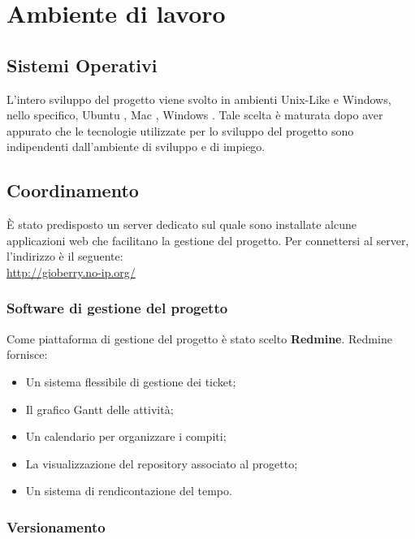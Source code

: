 
\section{Ambiente di lavoro} 

\subsection{Sistemi Operativi}

L’intero sviluppo del progetto viene svolto in ambienti Unix-Like e Windows, nello specifico, Ubuntu , Mac , Windows . Tale scelta è maturata dopo aver appurato che le tecnologie utilizzate per lo sviluppo del progetto sono indipendenti dall’ambiente di sviluppo e di impiego.

\subsection{Coordinamento}

È stato predisposto un server dedicato sul quale sono installate alcune applicazioni web
che facilitano la gestione del progetto. Per connettersi al server, l'indirizzo è il seguente:\\
\url{http://gioberry.no-ip.org/}
\subsubsection{Software di gestione del progetto} 
\label{subsec:Software di gestione del prodotto}
Come piattaforma di gestione del progetto è stato scelto \textbf{Redmine}. Redmine fornisce:
\begin{itemize}
\item Un sistema flessibile di gestione dei ticket;
\item Il grafico Gantt delle attività;
\item Un calendario per organizzare i compiti;
\item La visualizzazione del repository associato al progetto;
\item Un sistema di rendicontazione del tempo.
\end{itemize}


\subsubsection{Versionamento}


